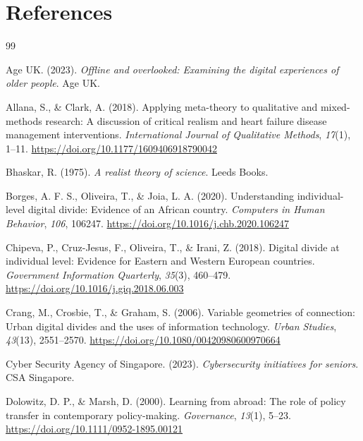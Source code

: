 \section*{References}
\label{sec:references}

\begin{thebibliography}{99}

Age UK. (2023). \textit{Offline and overlooked: Examining the digital experiences of older people}. Age UK.

Allana, S., \& Clark, A. (2018). Applying meta-theory to qualitative and mixed-methods research: A discussion of critical realism and heart failure disease management interventions. \textit{International Journal of Qualitative Methods}, \textit{17}(1), 1--11. \url{https://doi.org/10.1177/1609406918790042}

Bhaskar, R. (1975). \textit{A realist theory of science}. Leeds Books.

Borges, A. F. S., Oliveira, T., \& Joia, L. A. (2020). Understanding individual-level digital divide: Evidence of an African country. \textit{Computers in Human Behavior}, \textit{106}, 106247. \url{https://doi.org/10.1016/j.chb.2020.106247}

Chipeva, P., Cruz-Jesus, F., Oliveira, T., \& Irani, Z. (2018). Digital divide at individual level: Evidence for Eastern and Western European countries. \textit{Government Information Quarterly}, \textit{35}(3), 460--479. \url{https://doi.org/10.1016/j.giq.2018.06.003}

Crang, M., Crosbie, T., \& Graham, S. (2006). Variable geometries of connection: Urban digital divides and the uses of information technology. \textit{Urban Studies}, \textit{43}(13), 2551--2570. \url{https://doi.org/10.1080/00420980600970664}

Cyber Security Agency of Singapore. (2023). \textit{Cybersecurity initiatives for seniors}. CSA Singapore.

Dolowitz, D. P., \& Marsh, D. (2000). Learning from abroad: The role of policy transfer in contemporary policy-making. \textit{Governance}, \textit{13}(1), 5--23. \url{https://doi.org/10.1111/0952-1895.00121}


\end{thebibliography}
